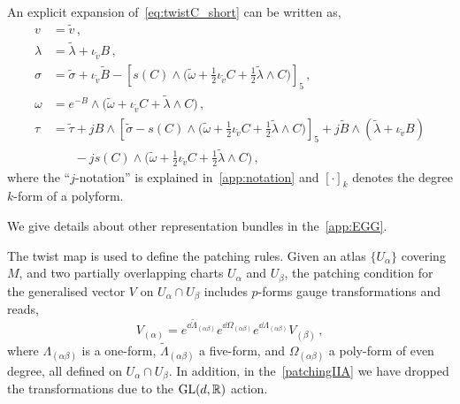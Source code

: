 \documentclass[debug]{phd}
\begin{document}
					An explicit expansion of~\eqref{eq:twistC_short} can be written as,
							\begin{equation}\label{eq:twistC}
								\begin{split}
									v 		&= \tilde{v}\, , \\[1.5mm]
									\lambda 	&= \tilde{\lambda} + \iota_{\tilde{v}} B\, , \\[1.5mm]
									\sigma 	&= \tilde{\sigma} + \iota_{\tilde{v}} \tilde{B} - \left[s(C) \wedge \big(\tilde{\omega} + \tfrac{1}{2} \iota_{\tilde{v}}C + \tfrac{1}{2}\tilde{\lambda} \wedge C \big)\right]_5 \, , \\[1.5mm]
									\omega 	&= e^{-B}\wedge \big( \tilde{\omega} + \iota_{\tilde{v}}C + \tilde{\lambda} \wedge C \big) \, , \\[1.5mm]
									\tau 		&= \tilde{\tau} + j B\wedge \left[\tilde{\sigma} - s(C)\wedge \big(\tilde{\omega} + \tfrac{1}{2} \iota_{\tilde{v}}C + \tfrac{1}{2}\tilde{\lambda} \wedge C \big)\right]_5 
												+ j\tilde{B} \wedge (\tilde{\lambda} + \iota_{\tilde{v}}B) \\
											&\phantom{=\tilde{\tau}} - j s(C)\wedge\big(\tilde{\omega} + \tfrac{1}{2}\iota_{\tilde{v}}C + \tfrac{1}{2} \tilde{\lambda} \wedge C \big) \, ,
								\end{split}
							\end{equation}
					where the ``$j$-notation'' is explained in~\cref{app:notation} and $[\cdot]_k$ denotes the degree $k$-form of a polyform.
					
					We give details about other representation bundles in the~\cref{app:EGG}.
					
					The twist map is used to define the patching rules.
					Given an atlas $\{U_\alpha\}$ covering $M$, and two partially overlapping charts $U_\alpha$ and $U_\beta$, the patching condition for the generalised vector $V$ on $U_\alpha \cap U_\beta$ includes $p$-forms gauge transformations and reads,
							\begin{equation}\label{patchingIIA}
								V_{(\alpha)} = e^{\dd \tilde{\Lambda}_{(\alpha\beta)}}e^{\dd \Omega_{(\alpha\beta)}} e^{\dd \Lambda_{(\alpha\beta)}} V_{(\beta)}\, ,
							\end{equation}
					where $\Lambda_{(\alpha \beta)}$ is a one-form, $\tilde\Lambda_{(\alpha \beta)}$ a five-form, and $\Omega_{(\alpha \beta)}$ a poly-form of even degree, all defined on $U_{\alpha} \cap U_{\beta}$.
					In addition, in the~\eqref{patchingIIA} we have dropped the transformations due to the $\mathrm{GL}(d,\mathbb{R})$ action.
					
\end{document}
